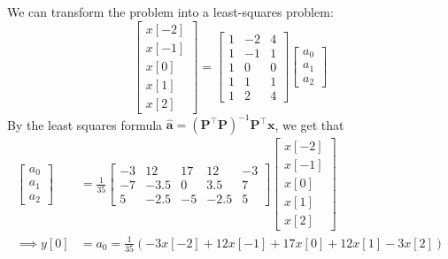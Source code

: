 \documentclass{article}
\begin{document}
We can transform the problem into a least-squares problem:
\begin{equation}
    \begin{bmatrix}
        x[-2] \\
        x[-1] \\
        x[0] \\
        x[1] \\
        x[2]
    \end{bmatrix}
    = 
    \begin{bmatrix}
        1 & -2 & 4 \\
        1 & -1 & 1 \\
        1 & 0 & 0 \\
        1 & 1 & 1 \\
        1 & 2 & 4
    \end{bmatrix}
    \begin{bmatrix}
        a_0 \\
        a_1 \\
        a_2
    \end{bmatrix}
\end{equation}
By the least squares formula \(\bm{\hat{a}} = (\bm{P}^\top \bm{P})^{-1} \bm{P}^\top \bm{x}\), we get that
\begin{align}
    \begin{bmatrix}
        a_0 \\
        a_1 \\
        a_2
    \end{bmatrix}
    &=
    \frac{1}{35} \begin{bmatrix}
        -3 & 12 & 17 & 12 & -3 \\
        -7 & -3.5 & 0 & 3.5 & 7 \\
        5 & -2.5 & -5 & -2.5 & 5
    \end{bmatrix}
    \begin{bmatrix}
        x[-2] \\
        x[-1] \\
        x[0] \\
        x[1] \\
        x[2]
    \end{bmatrix} \\
    \implies y[0] &= a_0 = \frac{1}{35} (-3x[-2] + 12x[-1] + 17x[0] + 12x[1] - 3x[2])
\end{align}

\subsection{}
\end{document}
